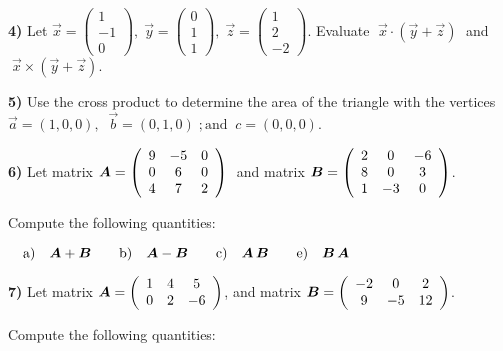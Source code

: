 \documentclass[11pt]{article}
\begin{document}
\textbf{4)} Let $ \vec{x} = \left( \begin{array}{c} 1 \\ -1 \\ 0 \end{array}\right), \; 
\vec{y}= \left( \begin{array}{c} 0 \\ 1 \\ 1 \end{array} \right), \;
\vec{z}= \left( \begin{array}{c} 1 \\ 2 \\ -2 \end{array} \right)$. 
Evaluate $\; \vec{x} \cdot (\vec{y} + \vec{z}) \;$ and $\; \vec{x} \times (\vec{y} + \vec{z})$. \vs

\textbf{5)} Use the cross product to determine the area of the triangle with the vertices \\
\hspace*{5mm} $\vec{a} =(1,0,0), \;\; \vec{b} =(0,1,0) \; ; \mbox{and} \;\; c =(0,0,0)$. \vs

\textbf{6)} Let matrix $\mbox{\boldmath $A$} = \left( \begin{array}{ccc} 9 & -5 & 0 \\ 0 & 6 & 0 \\ 4 & 7 & 2 \end{array} \right) \; $ 
and matrix $\mbox{\boldmath $B$} = \left( \begin{array}{ccc} 2 & 0 & -6  \\ 8 & 0 & 3 \\ 1 & -3 & 0 \end{array} \right)$. 

\hspace*{4.5mm}Compute the following quantities:

$\quad \mbox{a)} \quad \mbox{\boldmath $A$}+\mbox{\boldmath $B$} \qquad \mbox{b)} \quad \mbox{\boldmath $A$}-\mbox{\boldmath $B$} \qquad \mbox{c)} \quad \mbox{\boldmath $A$}\,\mbox{\boldmath $B$}
\qquad \mbox{e)} \quad \mbox{\boldmath $B$}\,\mbox{\boldmath $A$}$ \vs

\textbf{7)} Let matrix $\mbox{\boldmath $A$} = \left( \begin{array}{ccc} 1 & 4 & 5 \\ 0 & 2 & -6 \end{array} \right)$, 
and matrix $\mbox{\boldmath $B$} = \left( \begin{array}{ccc} -2 & 0 & 2 \\ 9 & -5 & 12 \end{array} \right)$. 

\hspace*{4.5mm}Compute the following quantities:
\end{document}
